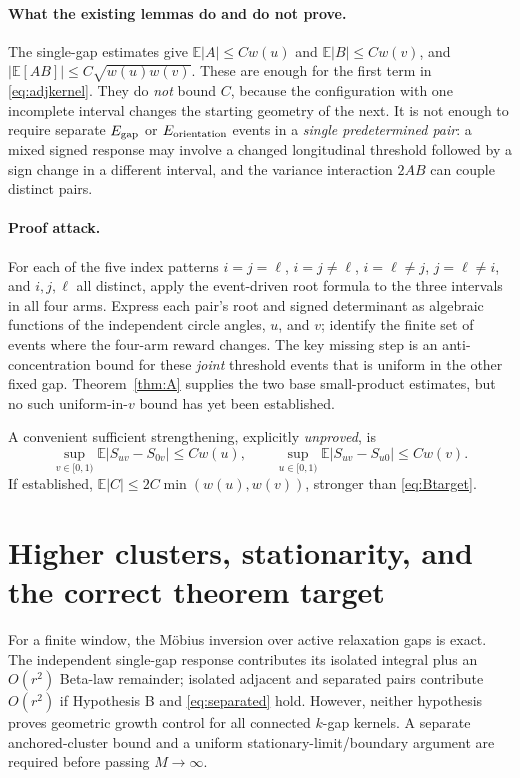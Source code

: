 \documentclass[11pt]{article}
\theoremstyle{remark}\newtheorem{remark}[theorem]{Remark}
\newcommand{\E}{\mathbb E}\newcommand{\Prb}{\mathbb P}\newcommand{\dd}{\mathrm d}
\begin{document}
\paragraph{What the existing lemmas do and do not prove.}
The single-gap estimates give $\E|A|\le Cw(u)$ and $\E|B|\le Cw(v)$, and
$|\E[AB]|\le C\sqrt{w(u)w(v)}$. These are enough for the first term in \eqref{eq:adjkernel}. They do \emph{not} bound $C$, because the configuration with one incomplete interval changes the starting geometry of the next. It is not enough to require separate $E_{\rm gap}$ or $E_{\rm orientation}$ events in a \emph{single predetermined pair}: a mixed signed response may involve a changed longitudinal threshold followed by a sign change in a different interval, and the variance interaction $2AB$ can couple distinct pairs.

\paragraph{Proof attack.}
For each of the five index patterns $i=j=\ell$, $i=j\ne\ell$, $i=\ell\ne j$, $j=\ell\ne i$, and $i,j,\ell$ all distinct, apply the event-driven root formula to the three intervals in all four arms. Express each pair's root and signed determinant as algebraic functions of the independent circle angles, $u$, and $v$; identify the finite set of events where the four-arm reward changes. The key missing step is an anti-concentration bound for these \emph{joint} threshold events that is uniform in the other fixed gap. Theorem~\ref{thm:A} supplies the two base small-product estimates, but no such uniform-in-$v$ bound has yet been established.

A convenient sufficient strengthening, explicitly \emph{unproved}, is
\begin{equation}\label{eq:uniformB}
\sup_{v\in[0,1)}\E|S_{uv}-S_{0v}|\le Cw(u),\qquad
\sup_{u\in[0,1)}\E|S_{uv}-S_{u0}|\le Cw(v).
\end{equation}
If established, $\E|C|\le 2C\min(w(u),w(v))$, stronger than \eqref{eq:Btarget}.

\section{Higher clusters, stationarity, and the correct theorem target}
For a finite window, the M\"obius inversion over active relaxation gaps is exact. The independent single-gap response contributes its isolated integral plus an $O(r^2)$ Beta-law remainder; isolated adjacent and separated pairs contribute $O(r^2)$ if Hypothesis B and \eqref{eq:separated} hold. However, neither hypothesis proves geometric growth control for all connected $k$-gap kernels. A separate anchored-cluster bound and a uniform stationary-limit/boundary argument are required before passing $M\to\infty$.
\end{document}
